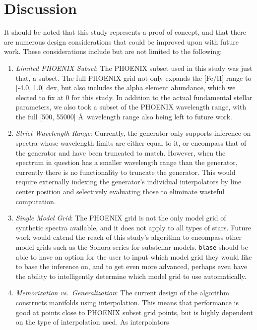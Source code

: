 \documentclass[twocolumn]{aastex631}
\begin{document}
\section{Discussion}
It should be noted that this study represents a proof of concept, and that 
there are numerous design considerations that could be improved upon with 
future work. These considerations include but are not limited to the 
following:
\begin{enumerate}[label=-]
    \item \textit{Limited PHOENIX Subset}: The PHOENIX subset used in this 
    study was just that, a subset. The full PHOENIX grid not only expands 
    the [Fe/H] range to [-4.0, 1.0] dex, but also includes the alpha element 
    abundance, which we elected to fix at 0 for this study. In addition to 
    the actual fundamental stellar parameters, we also took a subset of the 
    PHOENIX wavelength range, with the full [500, 55000] \AA \ wavelength 
    range also being left to future work.
    \item \textit{Strict Wavelength Range}: Currently, the generator only 
    supports inference on spectra whose wavelength limits are either equal 
    to it, or encompass that of the generator and have been truncated to 
    match. However, when the spectrum in question has a smaller wavelength 
    range than the generator, currently there is no functionality to truncate 
    the generator. This would require externally indexing the generator's 
    individual interpolators by line center position and selectively
    evaluating those to eliminate wasteful computation.
    \item \textit{Single Model Grid}: The PHOENIX grid is not the only model
    grid of synthetic spectra available, and it does not apply to all types 
    of stars. Future work would extend the reach of this study's algorithm 
    to encompass other model grids such as the Sonora series for substellar
    models. \texttt{blase} should be able to have an option for the user to 
    input which model grid they would like to base the inference on, and 
    to get even more advanced, perhaps even have the ability to intelligently
    determine which model grid to use automatically.
    \item \textit{Memorization vs.\ Generalization}: The current design of
    the algorithm constructs manifolds using interpolation. This means that
    performance is good at points close to PHOENIX subset grid points, but
    is highly dependent on the type of interpolation used. As interpolators

\end{enumerate}
\end{document}
